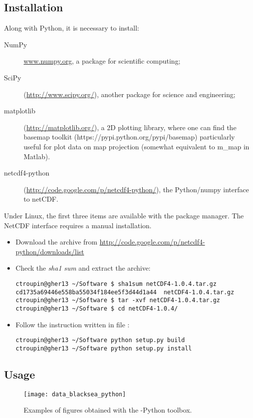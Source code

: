 \subsection{Installation}

Along with Python, it is necessary to install:
\begin{description}
\item[NumPy] \url{www.numpy.org}, a package for scientific computing;
\item[SciPy] (\url{http://www.scipy.org/}), another package for science and engineering;
\item[matplotlib] (\url{http://matplotlib.org/}), a 2D plotting library, where one can find the basemap toolkit (https://pypi.python.org/pypi/basemap) particularly useful for plot data on map projection (somewhat equivalent to m\_map in Matlab).
\item[netcdf4-python] (\url{http://code.google.com/p/netcdf4-python/}), the Python/numpy interface to netCDF.
\end{description}

Under Linux, the first three items are available with the package manager. The NetCDF interface requires a manual installation.

\begin{itemize}
\item Download the archive from \url{http://code.google.com/p/netcdf4-python/downloads/list}
\item Check the \textit{sha1 sum} and extract the archive:
\begin{lstlisting}[style=Bash]
ctroupin@gher13 ~/Software $ sha1sum netCDF4-1.0.4.tar.gz 
cd1735a69446e558ba55034f184ee5f3d44d1a44  netCDF4-1.0.4.tar.gz
ctroupin@gher13 ~/Software $ tar -xvf netCDF4-1.0.4.tar.gz 
ctroupin@gher13 ~/Software $ cd netCDF4-1.0.4/
\end{lstlisting}
\item Follow the instruction written in file :
\begin{lstlisting}[style=Bash]
ctroupin@gher13 ~/Software python setup.py build
ctroupin@gher13 ~/Software python setup.py install
\end{lstlisting}
\end{itemize}

\subsection{Usage}


\begin{figure}[htpb]
\centering
\texttt{[image: data\_blacksea\_python]}
\caption{Examples of figures obtained with the \diva-Python toolbox.}
\end{figure}


